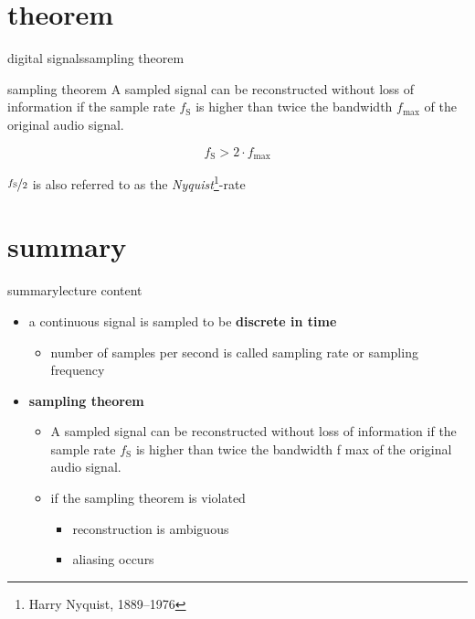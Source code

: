     \section{theorem}
        \begin{frame}{digital signals}{sampling theorem}
            \toremember{}
            
            \begin{block}{sampling theorem}
                A sampled signal can be reconstructed without loss of information if the sample rate $f_\mathrm{S}$ is higher than twice the bandwidth $f_\mathrm{max}$ of the original audio signal.
                
                \begin{equation*}
                    f_\mathrm{S} > 2\cdot f_\mathrm{max}
                \end{equation*}
            \end{block}
            
            \bigskip
            $\nicefrac{f_\mathrm{S}}{2}$ is also referred to as the \textit{Nyquist}\footnote{\tiny Harry Nyquist, 1889--1976}-rate
        \end{frame}	

    \section{summary}
        \begin{frame}{summary}{lecture content}
            \begin{itemize}
                \item   a continuous signal is sampled to be \textbf{discrete in time}
                    \begin{itemize}
                        \item   number of samples per second is called sampling rate or sampling frequency
                    \end{itemize}
                \bigskip
                \item      \textbf{sampling theorem}
                    \begin{itemize}
                        \item   A sampled signal can be reconstructed without loss of information if the sample rate $f_\mathrm{S}$ is higher than twice the bandwidth f max of the original audio signal.
                        \item   if the sampling theorem is violated
                            \begin{itemize}
                                \item   reconstruction is ambiguous
                                \item   aliasing occurs
                            \end{itemize}
                    \end{itemize}
            \end{itemize}
        \end{frame}

